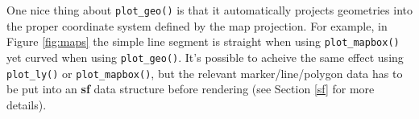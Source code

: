 \documentclass[
  12pt,
]{krantz}
\newenvironment{Shaded}{\begin{snugshade}}{\end{snugshade}}
\newcommand{\DataTypeTok}[1]{\textcolor[rgb]{0.13,0.29,0.53}{#1}}
\newcommand{\DecValTok}[1]{\textcolor[rgb]{0.00,0.00,0.81}{#1}}
\newcommand{\KeywordTok}[1]{\textcolor[rgb]{0.13,0.29,0.53}{\textbf{#1}}}
\newcommand{\NormalTok}[1]{#1}
\newcommand{\OperatorTok}[1]{\textcolor[rgb]{0.81,0.36,0.00}{\textbf{#1}}}
\newcommand{\StringTok}[1]{\textcolor[rgb]{0.31,0.60,0.02}{#1}}
\begin{document}
One nice thing about \texttt{plot\_geo()} is that it automatically projects geometries into the proper coordinate system defined by the map projection. For example, in Figure \ref{fig:maps} the simple line segment is straight when using \texttt{plot\_mapbox()} yet curved when using \texttt{plot\_geo()}. It's possible to acheive the same effect using \texttt{plot\_ly()} or \texttt{plot\_mapbox()}, but the relevant marker/line/polygon data has to be put into an \textbf{sf} data structure before rendering (see Section \ref{sf} for more details).

\begin{Shaded}
\end{Shaded}
\end{document}
